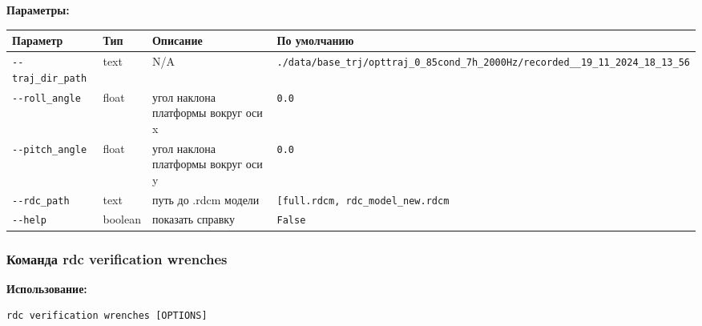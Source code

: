 \textbf{Параметры:}
\begin{center}
\fontsize{10pt}{10pt}\selectfont
\begin{longtable}[]{p{5cm}|p{2cm}|p{3.5cm}|p{5cm}}
    \hline
\toprule()
Параметр & Тип & Описание & По умолчанию \\
\hline
\midrule()
\endhead
\texttt{-\/-traj\_dir\_path} & text & N/A &
\texttt{./data/base\_trj/opttraj\_0\_85cond\_7h\_2000Hz/recorded\_\_19\_11\_2024\_18\_13\_56} \\
\hline
\texttt{-\/-roll\_angle} & float & угол наклона платформы вокруг оси x & \texttt{0.0} \\
\hline
\texttt{-\/-pitch\_angle} & float & угол наклона платформы вокруг оси y & \texttt{0.0} \\
\hline
\texttt{-\/-rdc\_path} & text & путь до .rdcm модели &
\texttt{{[}\textquotesingle{}full.rdcm\textquotesingle{},\ \textquotesingle{}rdc\_model\_new.rdcm\textquotesingle{}{]}} \\
\hline
\texttt{-\/-help} & boolean & показать справку &
\texttt{False} \\
\bottomrule()
\hline
\end{longtable}
\end{center}

\hypertarget{rdc-verification-wrenches}{%
\subsubsection{ Команда rdc verification wrenches}\label{rdc-verification-wrenches}}

\textbf{Использование:}
\begin{lstlisting}[language=python, numbers=none, frame=single]
rdc verification wrenches [OPTIONS]
\end{lstlisting}

